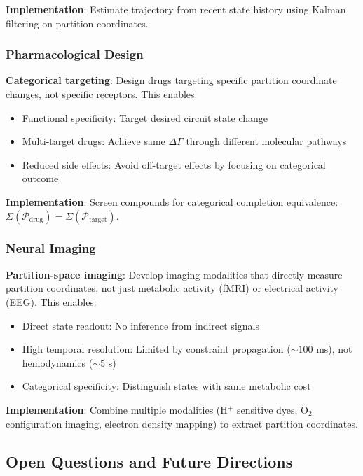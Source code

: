 \documentclass[aps,prd,twocolumn,superscriptaddress,floatfix,nofootinbib]{revtex4-2}
\theoremstyle{remark}
\begin{document}
\textbf{Implementation}: Estimate trajectory from recent state history using Kalman filtering on partition coordinates.

\subsubsection{Pharmacological Design}

\textbf{Categorical targeting}: Design drugs targeting specific partition coordinate changes, not specific receptors. This enables:
\begin{itemize}
\item Functional specificity: Target desired circuit state change
\item Multi-target drugs: Achieve same $\Delta \Gamma$ through different molecular pathways
\item Reduced side effects: Avoid off-target effects by focusing on categorical outcome
\end{itemize}

\textbf{Implementation}: Screen compounds for categorical completion equivalence: $\Sigma(\mathcal{P}_{\text{drug}}) = \Sigma(\mathcal{P}_{\text{target}})$.

\subsubsection{Neural Imaging}

\textbf{Partition-space imaging}: Develop imaging modalities that directly measure partition coordinates, not just metabolic activity (fMRI) or electrical activity (EEG). This enables:
\begin{itemize}
\item Direct state readout: No inference from indirect signals
\item High temporal resolution: Limited by constraint propagation ($\sim 100$ ms), not hemodynamics ($\sim 5$ s)
\item Categorical specificity: Distinguish states with same metabolic cost
\end{itemize}

\textbf{Implementation}: Combine multiple modalities (H$^+$ sensitive dyes, O$_2$ configuration imaging, electron density mapping) to extract partition coordinates.

\subsection{Open Questions and Future Directions}
\end{document}
